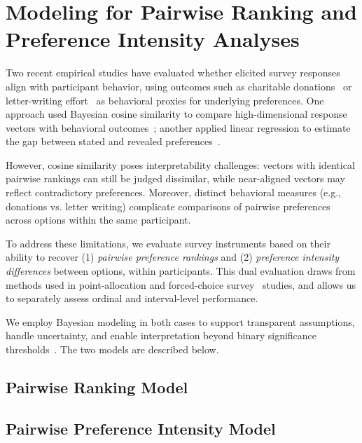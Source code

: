 \section{Modeling for Pairwise Ranking and Preference Intensity Analyses}
\label{sec:quantitative_measures}
Two recent empirical studies have evaluated whether elicited survey responses align with participant behavior, using outcomes such as charitable donations~\cite{chengCanShowWhat2021, cavaille2024cares} or letter-writing effort~\cite{cavaille2024cares} as behavioral proxies for underlying preferences. One approach used Bayesian cosine similarity to compare high-dimensional response vectors with behavioral outcomes~\cite{chengCanShowWhat2021}; another applied linear regression to estimate the gap between stated and revealed preferences~\cite{cavaille2024cares}.

However, cosine similarity poses interpretability challenges: vectors with identical pairwise rankings can still be judged dissimilar, while near-aligned vectors may reflect contradictory preferences. Moreover, distinct behavioral measures (e.g., donations vs. letter writing) complicate comparisons of pairwise preferences across options within the same participant.

To address these limitations, we evaluate survey instruments based on their ability to recover (1) \textit{pairwise preference rankings} and (2) \textit{preference intensity differences} between options, within participants. This dual evaluation draws from methods used in point-allocation and forced-choice survey~\cite{collewet2023preference} studies, and allows us to separately assess ordinal and interval-level performance. 

We employ Bayesian modeling in both cases to support transparent assumptions, handle uncertainty, and enable interpretation beyond binary significance thresholds~\cite{mcelreath2018statistical, kay2016researcher}. The two models are described below.

\subsection{Pairwise Ranking Model}
\label{sec:ordinal_measures}


\subsection{Pairwise Preference Intensity Model}
\label{sec:interval_measures}
